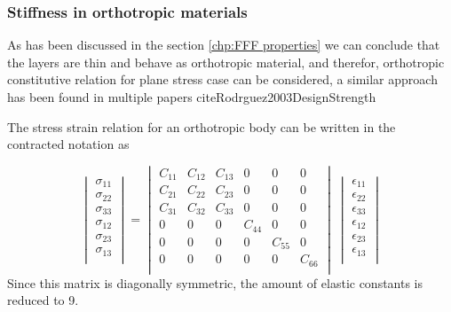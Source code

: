 \subsubsection{Stiffness in orthotropic materials}
As has been discussed in the section \ref{chp:FFF properties} we can conclude that the layers are thin and behave as orthotropic material, and therefor, orthotropic constitutive relation for plane stress case can be considered, a similar approach has been found in multiple papers cite{Rodrguez2003DesignStrength} \cite{Rodriguez2003MechanicalModeling} \cite{Somireddy2018DevelopmentFDM} 

The stress strain relation for an orthotropic body can be written in the contracted notation as

\begin{equation}\label{eqn:compliancematrix}
\begin{vmatrix}
\sigma_{11}\\
\sigma_{22}\\
\sigma_{33}\\
\sigma_{12}\\
\sigma_{23}\\
\sigma_{13}\\
\end{vmatrix}
=
\begin{vmatrix}
C_{11}&C_{12}&C_{13}&0&0&0\\
C_{21}&C_{22}&C_{23}&0&0&0\\
C_{31}&C_{32}&C_{33}&0&0&0\\
0&0&0&C_{44}&0&0\\
0&0&0&0&C_{55}&0\\
0&0&0&0&0&C_{66}\\
\end{vmatrix}
\
\begin{vmatrix}
\epsilon_{11}\\
\epsilon_{22}\\
\epsilon_{33}\\
\epsilon_{12}\\
\epsilon_{23}\\
\epsilon_{13}\\
\end{vmatrix}
\end{equation}Since this matrix is diagonally symmetric, the amount of elastic constants is reduced to 9.

